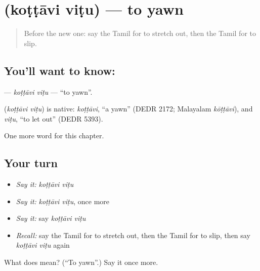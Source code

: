 \section[\texorpdfstring{\ta{கொட்டாவி} \ta{விடு} (koṭṭāvi viṭu)}{கொட்டாவி விடு (koṭṭāvi viṭu)}]{  (koṭṭāvi viṭu) — to yawn}

\label{lesson:TA-C168-kottavi-vitu}



\begin{quote}
Before the new one: say the Tamil for to stretch out, then the Tamil for to slip.
\end{quote}

\subsection*{You'll want to know:  }
\textbf{ } — \emph{koṭṭāvi viṭu} — \textquotedblleft{}to yawn\textquotedblright{}.

\begin{cousinweb}
\textbf{ } (\emph{koṭṭāvi viṭu}) is native: \emph{koṭṭāvi}, \textquotedblleft{}a yawn\textquotedblright{} (DEDR 2172; Malayalam \emph{kōṭṭāvi}), and \emph{viṭu}, \textquotedblleft{}to let out\textquotedblright{} (DEDR 5393).
\end{cousinweb}

\begin{grammarlens}[title={What you've built}]
One more word for this chapter.
\end{grammarlens}

\subsection*{Your turn}
\begin{itemize}
\raggedright
  \item \emph{Say it:} \emph{koṭṭāvi viṭu}
  \item \emph{Say it:} \emph{koṭṭāvi viṭu}, once more
  \item \emph{Say it:} say \emph{koṭṭāvi viṭu}
  \item \emph{Recall:} say the Tamil for to stretch out, then the Tamil for to slip, then say \emph{koṭṭāvi viṭu} again
\end{itemize}

\begin{tcolorbox}[breakable,colback=teal!4,colframe=teal!35!black,title={Before you move on}]
What does   mean? (\textquotedblleft{}To yawn\textquotedblright{}.) Say it once more.
\end{tcolorbox}
